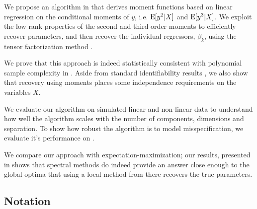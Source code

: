 We propose an algorithm in  that derives moment
functions based on linear regression on the conditional moments of $y$,
i.e. $\operatorname{E}[y^2 | X]$ and $\operatorname{E}[y^3 | X]$. We exploit the low rank properties
of the second and third order moments to efficiently recover parameters,
and then recover the individual regressors, $\beta_k$, using the tensor
factorization method \cite{AnandkumarGeHsu2012}.

We prove that this approach is indeed statistically consistent with
polynomial sample complexity in . Aside from
standard identifiability results \citationneeded, we also show that
recovery using moments places some independence requirements on the
variables $X$. 


We evaluate our algorithm on simulated linear and non-linear data to
understand how well the algorithm scales with the number of components,
dimensions and separation. To show how robust the algorithm is to model
misspecification, we evaluate it's performance on . 


We compare our approach with expectation-maximization; our results,
presented in  shows that spectral methods do
indeed provide an answer close enough to the global optima that using
a local method from there recovers the true parameters.  


\subsection{Notation}


